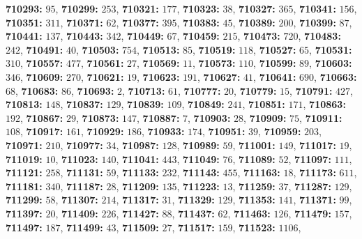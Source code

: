 \textsf{\bfseries 710293:} $95$, \textsf{\bfseries 710299:} $253$, \textsf{\bfseries 710321:} $177$, \textsf{\bfseries 710323:} $38$, \textsf{\bfseries 710327:} $365$, \textsf{\bfseries 710341:} $156$, \textsf{\bfseries 710351:} $311$, \textsf{\bfseries 710371:} $62$, \textsf{\bfseries 710377:} $395$, \textsf{\bfseries 710383:} $45$, \textsf{\bfseries 710389:} $200$, \textsf{\bfseries 710399:} $87$, \textsf{\bfseries 710441:} $137$, \textsf{\bfseries 710443:} $342$, \textsf{\bfseries 710449:} $67$, \textsf{\bfseries 710459:} $215$, \textsf{\bfseries 710473:} $720$, \textsf{\bfseries 710483:} $242$, \textsf{\bfseries 710491:} $40$, \textsf{\bfseries 710503:} $754$, \textsf{\bfseries 710513:} $85$, \textsf{\bfseries 710519:} $118$, \textsf{\bfseries 710527:} $65$, \textsf{\bfseries 710531:} $310$, \textsf{\bfseries 710557:} $477$, \textsf{\bfseries 710561:} $27$, \textsf{\bfseries 710569:} $11$, \textsf{\bfseries 710573:} $110$, \textsf{\bfseries 710599:} $89$, \textsf{\bfseries 710603:} $346$, \textsf{\bfseries 710609:} $270$, \textsf{\bfseries 710621:} $19$, \textsf{\bfseries 710623:} $191$, \textsf{\bfseries 710627:} $41$, \textsf{\bfseries 710641:} $690$, \textsf{\bfseries 710663:} $68$, \textsf{\bfseries 710683:} $86$, \textsf{\bfseries 710693:} $2$, \textsf{\bfseries 710713:} $61$, \textsf{\bfseries 710777:} $20$, \textsf{\bfseries 710779:} $15$, \textsf{\bfseries 710791:} $427$, \textsf{\bfseries 710813:} $148$, \textsf{\bfseries 710837:} $129$, \textsf{\bfseries 710839:} $109$, \textsf{\bfseries 710849:} $241$, \textsf{\bfseries 710851:} $171$, \textsf{\bfseries 710863:} $192$, \textsf{\bfseries 710867:} $29$, \textsf{\bfseries 710873:} $147$, \textsf{\bfseries 710887:} $7$, \textsf{\bfseries 710903:} $28$, \textsf{\bfseries 710909:} $75$, \textsf{\bfseries 710911:} $108$, \textsf{\bfseries 710917:} $161$, \textsf{\bfseries 710929:} $186$, \textsf{\bfseries 710933:} $174$, \textsf{\bfseries 710951:} $39$, \textsf{\bfseries 710959:} $203$, \textsf{\bfseries 710971:} $210$, \textsf{\bfseries 710977:} $34$, \textsf{\bfseries 710987:} $128$, \textsf{\bfseries 710989:} $59$, \textsf{\bfseries 711001:} $149$, \textsf{\bfseries 711017:} $19$, \textsf{\bfseries 711019:} $10$, \textsf{\bfseries 711023:} $140$, \textsf{\bfseries 711041:} $443$, \textsf{\bfseries 711049:} $76$, \textsf{\bfseries 711089:} $52$, \textsf{\bfseries 711097:} $111$, \textsf{\bfseries 711121:} $258$, \textsf{\bfseries 711131:} $59$, \textsf{\bfseries 711133:} $232$, \textsf{\bfseries 711143:} $455$, \textsf{\bfseries 711163:} $18$, \textsf{\bfseries 711173:} $611$, \textsf{\bfseries 711181:} $340$, \textsf{\bfseries 711187:} $28$, \textsf{\bfseries 711209:} $135$, \textsf{\bfseries 711223:} $13$, \textsf{\bfseries 711259:} $37$, \textsf{\bfseries 711287:} $129$, \textsf{\bfseries 711299:} $58$, \textsf{\bfseries 711307:} $214$, \textsf{\bfseries 711317:} $31$, \textsf{\bfseries 711329:} $129$, \textsf{\bfseries 711353:} $141$, \textsf{\bfseries 711371:} $99$, \textsf{\bfseries 711397:} $20$, \textsf{\bfseries 711409:} $226$, \textsf{\bfseries 711427:} $88$, \textsf{\bfseries 711437:} $62$, \textsf{\bfseries 711463:} $126$, \textsf{\bfseries 711479:} $157$, \textsf{\bfseries 711497:} $187$, \textsf{\bfseries 711499:} $43$, \textsf{\bfseries 711509:} $27$, \textsf{\bfseries 711517:} $159$, \textsf{\bfseries 711523:} $1106$, 
